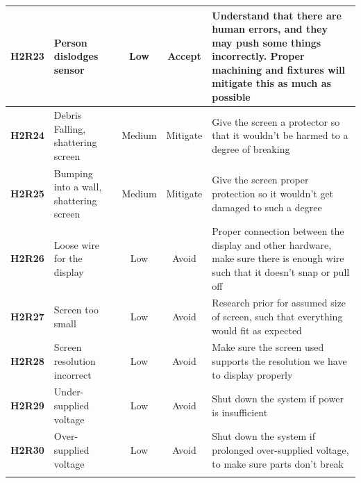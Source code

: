 \documentclass[11pt]{article}
\begin{document}
\begin{tabularx}{\textwidth}{ c  p{}  c  c  X }
				\hline
				\textbf{H2R23} & Person dislodges sensor & Low & Accept & Understand that there are human errors, and they may push some things incorrectly. Proper machining and fixtures will mitigate this as much as possible\\ 
				\hline
				\textbf{H2R24} & Debris Falling, shattering screen & Medium  & Mitigate & Give the screen a protector so that it wouldn't be harmed to a degree of breaking\\ 
				\hline
				\textbf{H2R25} & Bumping into a wall, shattering screen & Medium  & Mitigate & Give the screen proper protection so it wouldn't get damaged to such a degree  \\ 
				\hline
				\textbf{H2R26} & Loose wire for the display & Low  & Avoid  & Proper connection between the display and other hardware, make sure there is enough wire such that it doesn't snap or pull off \\ 
				\hline
				\textbf{H2R27} & Screen too small & Low  & Avoid & Research prior for assumed size of screen, such that everything would fit as expected\\ 
				\hline
				\textbf{H2R28} & Screen resolution incorrect & Low  & Avoid  & Make sure the screen used supports the resolution we have to display properly \\ 
				\hline
			 	\textbf{H2R29} & Under-supplied voltage & Low  & Avoid  & Shut down the system if power is insufficient \\ 
				\hline
				\textbf{H2R30} & Over-supplied voltage & Low  & Avoid  & Shut down the system if prolonged over-supplied voltage, to make sure parts don't break \\ 
				\bottomrule
				\caption{Hazards and its Mitigation Plan}
			\end{tabularx}
\end{document}
